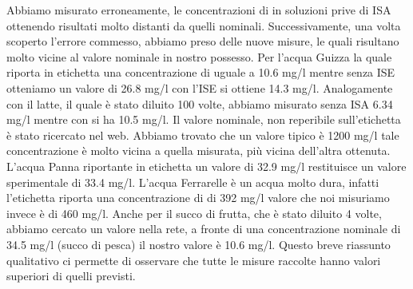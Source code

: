 Abbiamo misurato erroneamente, le concentrazioni di  in soluzioni prive di ISA ottenendo risultati molto distanti da quelli nominali. Successivamente, una volta scoperto l'errore commesso, abbiamo preso delle nuove misure, le quali risultano molto vicine al valore nominale in nostro possesso.
Per l'acqua Guizza la quale riporta in etichetta una concentrazione di  uguale a 10.6 mg/l mentre senza ISE otteniamo un valore di 26.8 mg/l con l'ISE si ottiene 14.3 mg/l.
Analogamente con il latte, il quale è stato diluito 100 volte, abbiamo misurato senza ISA 6.34 mg/l mentre con si ha 10.5 mg/l. Il valore nominale, non reperibile sull'etichetta è stato ricercato nel web. Abbiamo trovato che un valore tipico è 1200 mg/l tale concentrazione è molto vicina a quella misurata, più vicina dell'altra ottenuta.
L'acqua Panna riportante in etichetta un valore di 32.9 mg/l restituisce un valore sperimentale di 33.4 mg/l.
L'acqua Ferrarelle è un acqua molto dura, infatti l'etichetta riporta una concentrazione di  di 392 mg/l valore che noi misuriamo invece è di 460 mg/l.
Anche per il succo di frutta, che è stato diluito 4 volte, abbiamo cercato un valore nella rete, a fronte di una concentrazione nominale di 34.5 mg/l (succo di pesca) il nostro valore è 10.6 mg/l.
Questo breve riassunto qualitativo ci permette di osservare che tutte le misure raccolte hanno valori superiori di quelli previsti.
 


